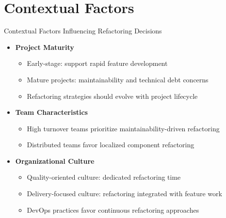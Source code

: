 \documentclass{beamer}
\begin{document}
\section{Contextual Factors}
\begin{frame}{Contextual Factors Influencing Refactoring Decisions}
    \begin{itemize}
        \item \textbf{Project Maturity}
            \begin{itemize}
                \item Early-stage: support rapid feature development
                \item Mature projects: maintainability and technical debt concerns
                \item Refactoring strategies should evolve with project lifecycle
            \end{itemize}
        \item \textbf{Team Characteristics}
            \begin{itemize}
                \item High turnover teams prioritize maintainability-driven refactoring
                \item Distributed teams favor localized component refactoring
            \end{itemize}
        \item \textbf{Organizational Culture}
            \begin{itemize}
                \item Quality-oriented culture: dedicated refactoring time
                \item Delivery-focused culture: refactoring integrated with feature work
                \item DevOps practices favor continuous refactoring approaches
            \end{itemize}
    \end{itemize}
\end{frame}

\end{document}
